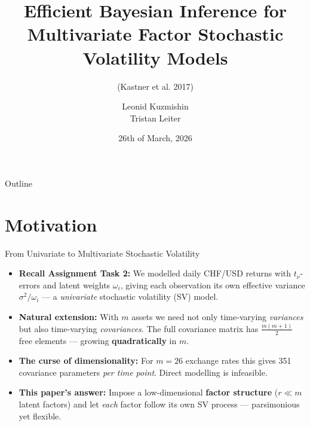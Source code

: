 \documentclass[10pt]{beamer}\usepackage[]{graphicx}\usepackage[table]{xcolor}
\title[Factor SV Models]{Efficient Bayesian Inference for\\Multivariate Factor Stochastic Volatility Models}
\subtitle{(Kastner et al. 2017)}
\author{Leonid Kuzmishin \\
        Tristan Leiter}
\institute[WU]{Vienna University of Economics and Business \\
        \medskip
        \scriptsize Bayesian Econometrics -- Summer Term 2026}
\date{26th of March, 2026}
\begin{document}

\begin{frame}
  \titlepage
\end{frame}


\begin{frame}{Outline}
  \tableofcontents
\end{frame}


\section{Motivation}
\begin{frame}{From Univariate to Multivariate Stochastic Volatility}
  \begin{itemize}
    \setlength\itemsep{0.9em}

    \item \textbf{Recall Assignment Task 2:} We modelled daily CHF/USD returns
    with $t_\nu$-errors and latent weights $\omega_i$, giving each observation
    its own effective variance $\sigma^2/\omega_i$ --- a \emph{univariate}
    stochastic volatility (SV) model.

    \item \textbf{Natural extension:} With $m$ assets we need not only
    time-varying \emph{variances} but also time-varying \emph{covariances}.
    The full covariance matrix has $\tfrac{m(m+1)}{2}$ free elements ---
    growing \textbf{quadratically} in $m$.

    \item \textbf{The curse of dimensionality:} For $m=26$ exchange rates
    this gives 351 covariance parameters \emph{per time point}.
    Direct modelling is infeasible.

    \item \textbf{This paper's answer:} Impose a low-dimensional
    \textbf{factor structure} ($r \ll m$ latent factors) and let \emph{each}
    factor follow its own SV process --- parsimonious yet flexible.

  \end{itemize}
\end{frame}

\end{document}
